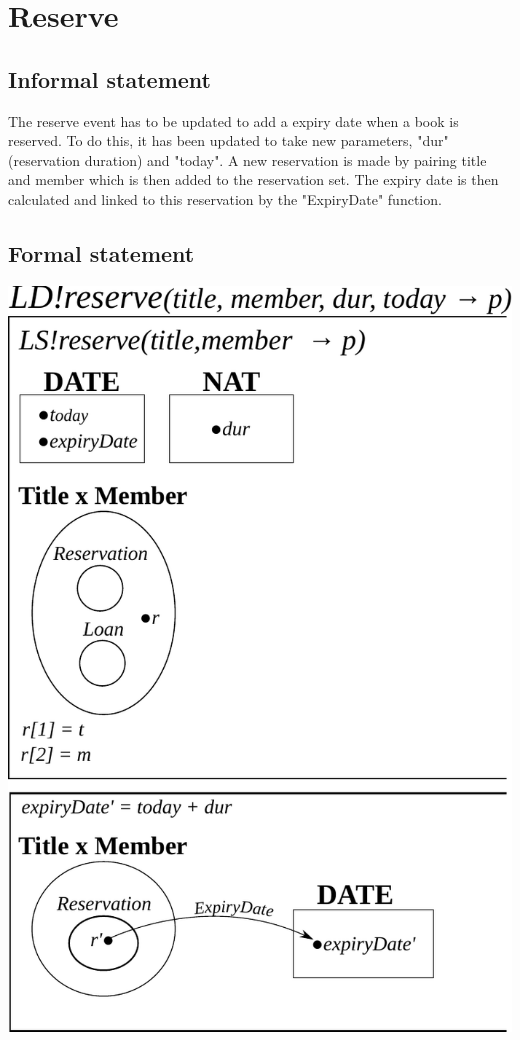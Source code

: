 \documentclass[]{report}
\begin{document}
\section{Reserve}
\subsection{Informal statement}
The reserve event has to be updated to add a expiry date when a book is reserved. To do this, it has been updated to take new parameters, "dur" (reservation duration) and "today". A new reservation is made by pairing title and member which is then added to the reservation set. The expiry date is then calculated and linked to this reservation by the "ExpiryDate" function.
\subsection{Formal statement}
\begin{center}
	\includegraphics[scale=0.75]{reserve.pdf}
\end{center}
\newpage
\end{document}

